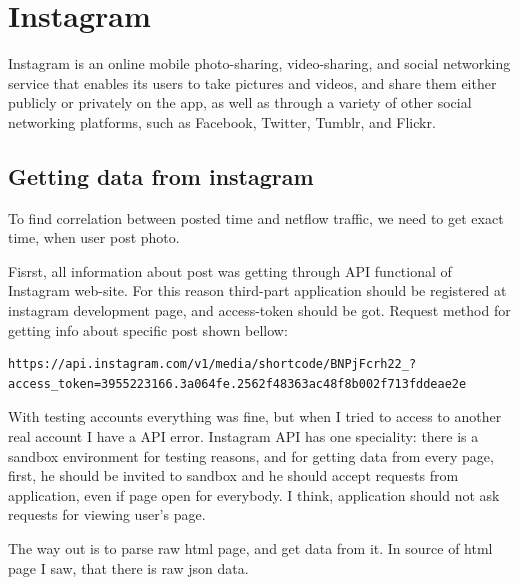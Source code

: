 \section{Instagram}

Instagram is an online mobile photo-sharing, video-sharing, and social networking service that enables its users to take pictures and videos, and share them either publicly or privately on the app, as well as through a variety of other social networking platforms, such as Facebook, Twitter, Tumblr, and Flickr. \cite{instagram1}

\subsection{Getting data from instagram}

To find correlation between posted time and netflow traffic, we need to get exact time, when user post photo.

Fisrst, all information about post was getting through API functional of Instagram web-site. For this reason third-part application should be registered at instagram development page, and access-token should be got. Request method for getting info about specific post shown bellow:

\begin{lstlisting}
https://api.instagram.com/v1/media/shortcode/BNPjFcrh22_?access_token=3955223166.3a064fe.2562f48363ac48f8b002f713fddeae2e
\end{lstlisting}

With testing accounts everything was fine, but when I tried to access to another real account I have a API error. Instagram API has one speciality: there is a sandbox environment for testing reasons, and for getting data from every page, first, he should be invited to sandbox and he should accept requests from application, even if page open for everybody. I think, application should not ask requests for viewing user's page. 

The way out is to parse raw html page, and get data from it. In source of html page I saw, that there is raw json data.

\begin{figure}[H]
\end{figure}

